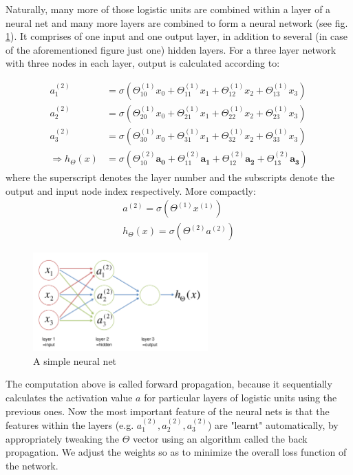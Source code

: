\documentclass[a4paper, 11pt]{article}
\numberwithin{equation}{section}
\begin{document}
	Naturally, many more of those logistic units are combined within a layer of a neural net and many more layers are combined to form a neural network (see fig. \ref{fig:neural_net}). It comprises of one input and one output layer, in addition to several (in case of the aforementioned figure just one) hidden layers. For a three layer network with three nodes in each layer, output is calculated according to:
	
	\begin{align}
	a_1^{(2)} &= \sigma (\Theta_{10}^{(1)} x_0 + \Theta_{11}^{(1)} x_1  + \Theta_{12}^{(1)} x_2  + \Theta_{13}^{(1)} x_3) \\
	a_2^{(2)} &= \sigma (\Theta_{20}^{(1)} x_0 + \Theta_{21}^{(1)} x_1  + \Theta_{22}^{(1)} x_2  + \Theta_{23}^{(1)} x_3) \\
	a_3^{(2)} &= \sigma (\Theta_{30}^{(1)} x_0 + \Theta_{31}^{(1)} x_1  + \Theta_{32}^{(1)} x_2  + \Theta_{33}^{(1)} x_3) \\
	\Rightarrow h_{\Theta} (x) &= \sigma (\Theta_{10}^{(2)} \boldsymbol{a_0} + \Theta_{11}^{(2)} \boldsymbol{a_1}  + \Theta_{12}^{(2)} \boldsymbol{a_2}  + \Theta_{13}^{(2)} \boldsymbol{a_3})
	\end{align}
	where the superscript denotes the layer number and the subscripts denote the output and input node index respectively. More compactly:
	\begin{align}
	a^{(2)} = \sigma(\Theta^{(1)} x^{(1)}) \\
	h_{\Theta}(x) = \sigma(\Theta^{(2)} a^{(2)})
	\end{align}
	
	\begin{figure}[!h]
		\centering
		\includegraphics[page=1,width=0.60\textwidth]{neural_net.pdf}
		\caption{\label{fig:neural_net}{A simple neural net}}
	\end{figure}
	
	The computation above is called forward propagation, because it sequentially calculates the activation value $a$ for particular layers of logistic units using the previous ones. Now the most important feature of the neural nets is that the features within the layers (e.g. $a_1^{(2)}, a_2^{(2)}, a_3^{(2)}$) are "learnt" automatically, by appropriately tweaking the $\Theta$ vector using an algorithm called the back propagation. We adjust the weights so as to minimize the overall loss function of the network.
	
\end{document}
